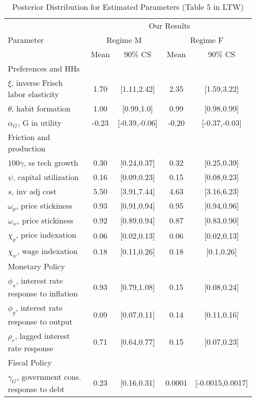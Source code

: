 \documentclass[letterpaper,12pt]{article}%
\begin{document}
\begin{table}[H]
	\centering
	\begin{threeparttable}
		\caption{Posterior Distribution for Estimated Parameters (Table 5 in LTW)}
		\begin{tabular}{l c c  c c}
			\toprule
			& \multicolumn{4}{c}{Our Results}  \\
			\cmidrule{2-5}
			Parameter & \multicolumn{2}{c}{Regime M} & \multicolumn{2}{c}{Regime F}\\
			& Mean & 90\% CS & Mean &  90\% CS \\
			\midrule
			Preferences and HHs&     &   &  &    \\
			\quad $\xi$, inverse Frisch labor elasticity&  1.70 & [1.11,2.42] & 2.35 & [1.59,3.22]  \\
			\quad $\theta$, habit formation & 1.00 & [0.99,1.0]& 0.99 & [0.98,0.99]\\
			\quad $\alpha_G$, G in utility & -0.23 & [-0.39,-0.06] & -0.20 & [-0.37,-0.03] \\
			Friction and production&     &   &  &    \\
			\quad $100\gamma$, ss tech growth&  0.30 & [0.24,0.37] & 0.32 & [0.25,0.39]  \\
			\quad $\psi$, capital utilization & 0.16 & [0.09,0.23]& 0.15 & [0.08,0.23] \\
			\quad $s$, inv adj cost & 5.50 & [3.91,7.44]& 4.63 & [3.16,6.23] \\
			\quad $\omega_p$, price stickiness&  0.93 & [0.91,0.94]& 0.95 & [0.94,0.96]  \\
			\quad $\omega_w$, price stickiness&  0.92 & [0.89,0.94]& 0.87 & [0.83,0.90]  \\
			\quad $\chi_p$, price indexation&  0.06 & [0.02,0.13] & 0.06 & [0.02,0.13] \\
			\quad $\chi_w$, wage indexation&  0.18 & [0.11,0.26] & 0.18 & [0.1,0.26]\\
			Monetary Policy&     &   &  &    \\
			\quad $\phi_\pi$, interest rate response to inflation&  0.93 & [0.79,1.08] & 0.15 & [0.08,0.24] \\
			\quad $\phi_y$, interest rate response to output & 0.09 & [0.07,0.11]& 0.14 & [0.11,0.16] \\
			\quad $\rho_r$, lagged interest rate response & 0.71 & [0.64,0.77] & 0.15 & [0.07,0.23] \\ 
			Fiscal Policy&     &   &  &    \\
			\quad $\gamma_G$, government cons. response to debt&  0.23 & [0.16,0.31]& 0.0001 & [-0.0015,0.0017]  \\

\end{tabular}
\end{threeparttable}
\end{table}
\end{document}
